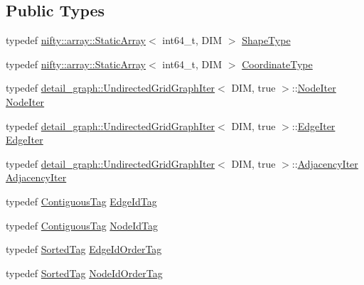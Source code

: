 \subsection*{Public Types}
\begin{DoxyCompactItemize}
\item 
typedef \hyperlink{namespacenifty_1_1array_a683f151f19c851754e0c6d55ed16a0c2}{nifty\+::array\+::\+Static\+Array}$<$ int64\+\_\+t, D\+IM $>$ \hyperlink{classnifty_1_1graph_1_1UndirectedGridGraph_3_01DIM_00_01true_01_4_abea92f7d305119d361e2189b00e495ba}{Shape\+Type}
\item 
typedef \hyperlink{namespacenifty_1_1array_a683f151f19c851754e0c6d55ed16a0c2}{nifty\+::array\+::\+Static\+Array}$<$ int64\+\_\+t, D\+IM $>$ \hyperlink{classnifty_1_1graph_1_1UndirectedGridGraph_3_01DIM_00_01true_01_4_a45f38cce72559c7bdefa3d219486bae4}{Coordinate\+Type}
\item 
typedef \hyperlink{classnifty_1_1graph_1_1detail__graph_1_1UndirectedGridGraphIter}{detail\+\_\+graph\+::\+Undirected\+Grid\+Graph\+Iter}$<$ D\+IM, true $>$\+::\hyperlink{classnifty_1_1graph_1_1UndirectedGridGraph_3_01DIM_00_01true_01_4_a977e01bd675cc7d454ce18417c6e0397}{Node\+Iter} \hyperlink{classnifty_1_1graph_1_1UndirectedGridGraph_3_01DIM_00_01true_01_4_a977e01bd675cc7d454ce18417c6e0397}{Node\+Iter}
\item 
typedef \hyperlink{classnifty_1_1graph_1_1detail__graph_1_1UndirectedGridGraphIter}{detail\+\_\+graph\+::\+Undirected\+Grid\+Graph\+Iter}$<$ D\+IM, true $>$\+::\hyperlink{classnifty_1_1graph_1_1UndirectedGridGraph_3_01DIM_00_01true_01_4_adc2fd416d91079b5450887b0c2c3cf05}{Edge\+Iter} \hyperlink{classnifty_1_1graph_1_1UndirectedGridGraph_3_01DIM_00_01true_01_4_adc2fd416d91079b5450887b0c2c3cf05}{Edge\+Iter}
\item 
typedef \hyperlink{classnifty_1_1graph_1_1detail__graph_1_1UndirectedGridGraphIter}{detail\+\_\+graph\+::\+Undirected\+Grid\+Graph\+Iter}$<$ D\+IM, true $>$\+::\hyperlink{classnifty_1_1graph_1_1UndirectedGridGraph_3_01DIM_00_01true_01_4_a9779969eb8762908d43eab3d9d3b17b1}{Adjacency\+Iter} \hyperlink{classnifty_1_1graph_1_1UndirectedGridGraph_3_01DIM_00_01true_01_4_a9779969eb8762908d43eab3d9d3b17b1}{Adjacency\+Iter}
\item 
typedef \hyperlink{structnifty_1_1graph_1_1ContiguousTag}{Contiguous\+Tag} \hyperlink{classnifty_1_1graph_1_1UndirectedGridGraph_3_01DIM_00_01true_01_4_a0d9a24c893bf3f5f0cd61873bb77dfe1}{Edge\+Id\+Tag}
\item 
typedef \hyperlink{structnifty_1_1graph_1_1ContiguousTag}{Contiguous\+Tag} \hyperlink{classnifty_1_1graph_1_1UndirectedGridGraph_3_01DIM_00_01true_01_4_a35ae15ae07ebf58ef26916b417fba878}{Node\+Id\+Tag}
\item 
typedef \hyperlink{structnifty_1_1graph_1_1SortedTag}{Sorted\+Tag} \hyperlink{classnifty_1_1graph_1_1UndirectedGridGraph_3_01DIM_00_01true_01_4_aca991599ad4c8532f2d07ed7bc507449}{Edge\+Id\+Order\+Tag}
\item 
typedef \hyperlink{structnifty_1_1graph_1_1SortedTag}{Sorted\+Tag} \hyperlink{classnifty_1_1graph_1_1UndirectedGridGraph_3_01DIM_00_01true_01_4_accf075c1b2a1820d15eea368562c93aa}{Node\+Id\+Order\+Tag}
\end{DoxyCompactItemize}
